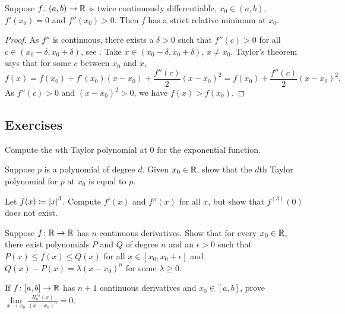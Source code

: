 \begin{prop}
Suppose $f \colon (a,b) \to {\mathbb{R}}$ is twice continuously differentiable,
$x_0 \in (a,b)$, $f'(x_0) = 0$ and $f''(x_0) > 0$.  Then $f$ has a strict relative
minimum at $x_0$.
\end{prop}

\begin{proof}
As $f''$ is continuous, there exists a $\delta > 0$
such that $f''(c) > 0$ for all $c \in (x_0-\delta,x_0+\delta)$,
see .
Take $x \in (x_0-\delta,x_0+\delta)$, $x \not= x_0$.
Taylor's theorem says that for some $c$ between $x_0$ and $x$,
\begin{equation*}
f(x) 
=
f(x_0) + f'(x_0) (x-x_0) +
\frac{f''(c)}{2}{(x-x_0)}^{2} 
=
f(x_0) + \frac{f''(c)}{2}{(x-x_0)}^{2}  .
\end{equation*}
As $f''(c) > 0$ and ${(x-x_0)}^2 > 0$, we have $f(x) > f(x_0)$.
\end{proof}

\subsection{Exercises}

\begin{exercise}
Compute the $n$th Taylor polynomial at $0$ for the exponential function.
\end{exercise}

\begin{exercise}
Suppose $p$ is a polynomial of degree $d$.  Given $x_0 \in {\mathbb{R}}$,
show that
the $d$th Taylor polynomial for $p$ at $x_0$ is equal to $p$.
\end{exercise}

\begin{exercise}
Let $f(x) \coloneqq \left\lvert {x} \right\rvert^3$.  Compute $f'(x)$ and $f''(x)$ for all $x$,
but show that $f^{(3)}(0)$ does not exist.
\end{exercise}

\begin{exercise}
Suppose $f \colon {\mathbb{R}} \to {\mathbb{R}}$ has $n$ continuous derivatives.  Show
that for every $x_0 \in {\mathbb{R}}$,
there exist polynomials $P$ and $Q$ of degree $n$ and 
an $\epsilon > 0$ such that $P(x) \leq f(x) \leq Q(x)$ for all $x \in
[x_0,x_0+\epsilon]$  and
$Q(x)-P(x) = \lambda {(x-x_0)}^n$ for some $\lambda \geq 0$.
\end{exercise}

\begin{exercise}
If $f \colon [a,b] \to {\mathbb{R}}$ has $n+1$ continuous derivatives
and $x_0 \in [a,b]$,
prove
$\lim\limits_{x\to x_0} \frac{R_n^{x_0}(x)}{{(x-x_0)}^n} = 0$.
\end{exercise}

